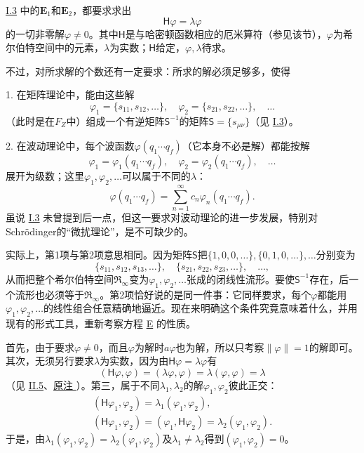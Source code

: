 \documentclass[fontsize=13pt,twoside,openany,headings=normal,parskip=false,bookmarkpackage=false,DIV=calc]{scrbook}
\begin{document}
\hyperref[sec:I.3]{I.3} 中的$\hyperref[eq:I.3.E1]{\mathbf{E}_1}$和$\hyperref[eq:I.3.E2]{\mathbf{E}_2}$，都要求求出
\begin{equation}
\mathsf H\varphi=\lambda\varphi\tag{E}\label{eq:II.6.E}
\end{equation}
的一切非零解$\varphi\ne0$。其中$\mathsf H$是与哈密顿函数相应的厄米算符（参见该节），$\varphi$为希尔伯特空间中的元素，$\lambda$为实数；$\mathsf H$给定，$\varphi,\allowbreak \lambda$待求。

\hypertarget{origpage-54}{}\label{origpage-54}不过，对所求解的个数还有一定要求：所求的解必须足够多，使得

1. 在矩阵理论中，能由这些解
\[
\varphi_1=\{s_{11},s_{12},\ldots\},\quad\varphi_2=\{s_{21},s_{22},\ldots\},\quad\ldots
\]
（此时是在$F_Z$中）组成一个有逆矩阵$\mathsf S^{-1}$的矩阵$\mathsf S=\{s_{\mu\nu}\}$（见 \hyperref[sec:I.3]{I.3}）。

2. 在波动理论中，每个波函数$\varphi(q_1\cdots q_f)$（它本身不必是解）都能按解
\[
\varphi_1=\varphi_1(q_1\cdots q_f),\quad\varphi_2=\varphi_2(q_1\cdots q_f),\quad\ldots
\]
展开为级数；这里$\varphi_1,\allowbreak \varphi_2,\allowbreak \ldots$可以属于不同的$\lambda$：
\[
\varphi(q_1\cdots q_f)=\sum_{n=1}^\infty c_n\varphi_n(q_1\cdots q_f).
\]
虽说 \hyperref[sec:I.3]{I.3} 未曾提到后一点，但这一要求对波动理论的进一步发展，特别对Schr\"odinger的“微扰理论”，是不可缺少的。

实际上，第1项与第2项意思相同。因为矩阵$\mathsf S$把$\{1,\allowbreak 0,\allowbreak 0,\allowbreak \ldots\},\allowbreak \{0,\allowbreak 1,\allowbreak 0,\allowbreak \ldots\},\allowbreak \ldots$分别变为
\[
\{s_{11},s_{12},s_{13},\ldots\},\quad\{s_{21},s_{22},s_{23},\ldots\},\quad\ldots,
\]
从而把整个希尔伯特空间$\mathfrak{R}_\infty$变为$\varphi_1,\allowbreak \varphi_2,\allowbreak \ldots$张成的闭线性流形。要使$\mathsf S^{-1}$存在，后一个流形也必须等于$\mathfrak{R}_\infty$。第2项恰好说的是同一件事：它同样要求，每个$\varphi$都能用$\varphi_1,\allowbreak \varphi_2,\allowbreak \ldots$的线性组合任意精确地逼近。现在来明确这个条件究竟意味着什么，并用现有的形式工具，重新考察方程 \hyperref[eq:II.6.E]{E} 的性质。

首先，由于要求$\varphi\ne0$，而且$\varphi$为解时$a\varphi$也为解，所以只考察$\|\varphi\|=1$的解即可。其次，无须另行要求$\lambda$为实数，因为由$\mathsf H\varphi=\lambda\varphi$有
\[
(\mathsf H\varphi,\varphi)=(\lambda\varphi,\varphi)=\lambda(\varphi,\varphi)=\lambda
\]
（见 \hyperref[sec:II.5]{II.5}、\CJKglue \hyperlink{note-61}{原注 }）。第三，属于不同$\lambda_1,\allowbreak \lambda_2$的解$\varphi_1,\allowbreak \varphi_2$彼此正交：
\begin{gather*}
(\mathsf H\varphi_1,\varphi_2)=\lambda_1(\varphi_1,\varphi_2),\\
(\mathsf H\varphi_1,\varphi_2)=(\varphi_1,\mathsf H\varphi_2)=\lambda_2(\varphi_1,\varphi_2).
\end{gather*}
于是，由$\lambda_1(\varphi_1,\allowbreak \varphi_2)=\lambda_2(\varphi_1,\allowbreak \varphi_2)$及$\lambda_1\ne\lambda_2$得到$(\varphi_1,\allowbreak \varphi_2)=0$。
\end{document}
